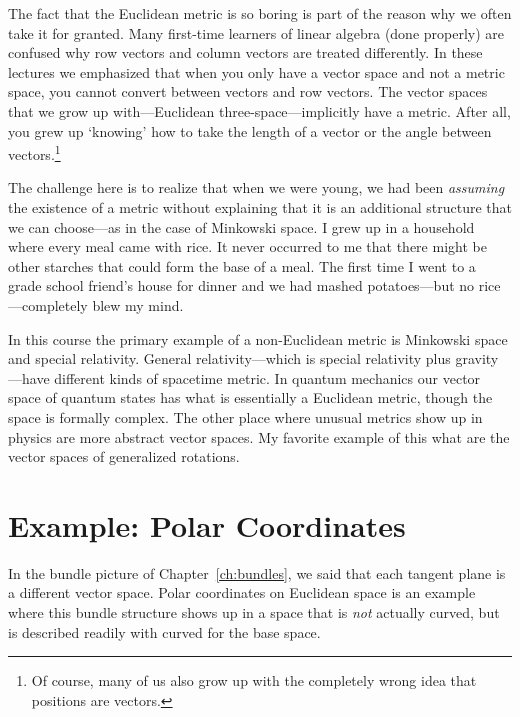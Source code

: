 \documentclass[12pt, oneside]{report}    %
\let\oldsection\section
\def\section{%
  \setcounter{sidenote}{1}%
  \oldsection
}
\begin{document}
\begin{example}
The fact that the Euclidean metric is so boring is part of the reason why we often take it for granted. Many first-time learners of linear algebra (done properly) are confused why row vectors and column vectors are treated differently. In these lectures we emphasized that when you only have a vector space and not a metric space, you cannot convert between vectors and row vectors. The vector spaces that we grow up with---Euclidean three-space---implicitly have a metric. After all, you grew up `knowing' how to take the length of a vector or the angle between vectors.\footnote{Of course, many of us also grow up with the completely wrong idea that positions are vectors.} 

The challenge here is to realize that when we were young, we had been \emph{assuming} the existence of a metric without explaining that it is an additional structure that we can choose---as in the case of Minkowski space. I grew up in a household where every meal came with rice. It never occurred to me that there might be other starches that could form the base of a meal. The first time I went to a grade school friend's house for dinner and we had mashed potatoes---but no rice---completely blew my mind. 
\end{example}

In this course the primary example of a non-Euclidean metric is Minkowski space and special relativity. General relativity---which is special relativity plus gravity---have different kinds of spacetime metric. In quantum mechanics our vector space of quantum states has what is essentially a Euclidean metric, though the space is formally complex. The other place where unusual metrics show up in physics are more abstract vector spaces. My favorite example of this what are the vector spaces of generalized rotations.


\section{Example: Polar Coordinates}
\label{sec:polar:coordinates}

In the bundle picture of Chapter~\ref{ch:bundles}, we said that each tangent plane is a different vector space. Polar coordinates on Euclidean space is an example where this bundle structure shows up in a space that is \emph{not} actually curved, but is described readily with curved for the base space. 
\end{document}
